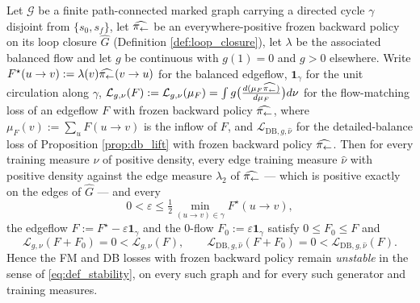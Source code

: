 \begin{proposition}\label{prop:frozen_unstable_full}
Let $\mathcal G$ be a finite path-connected marked graph carrying a directed cycle $\gamma$ disjoint from $\{s_0,s_f\}$, let $\widehat{\pi_{\leftarrow}}$ be an everywhere-positive frozen backward policy on its loop closure $\widehat G$ (Definition \ref{def:loop_closure}), let $\lambda$ be the associated balanced flow and let $g$ be continuous with $g(1)=0$ and $g>0$ elsewhere. Write $F^\star(u\rightarrow v):=\lambda(v)\widehat{\pi_{\leftarrow}}(v\rightarrow u)$ for the balanced edgeflow, $\mathbf 1_\gamma$ for the unit circulation along $\gamma$, $\mathcal L_{g,\nu}(F):=\mathcal L_{g,\nu}(\mu_F)=\int g\bigl(\frac{d(\mu_F\widehat{\pi_{\leftarrow}})}{d\mu_F}\bigr)d\nu$ for the flow-matching loss of an edgeflow $F$ with frozen backward policy $\widehat{\pi_{\leftarrow}}$, where $\mu_F(v):=\sum_uF(u\rightarrow v)$ is the inflow of $F$, and $\mathcal L_{\mathrm{DB},g,\widehat\nu}$ for the detailed-balance loss of Proposition \ref{prop:db_lift} with frozen backward policy $\widehat{\pi_{\leftarrow}}$. Then for every training measure $\nu$ of positive density, every edge training measure $\widehat\nu$ with positive density against the edge measure $\lambda_2$ of $\widehat{\pi_{\leftarrow}}$ --- which is positive exactly on the edges of $\widehat G$ --- and every
\begin{equation}
    0<\varepsilon\leq\tfrac12\min_{(u\rightarrow v)\in\gamma}F^\star(u\rightarrow v),
\end{equation}
the edgeflow $F:=F^\star-\varepsilon\mathbf 1_\gamma$ and the $0$-flow $F_0:=\varepsilon\mathbf 1_\gamma$ satisfy $0\leq F_0\leq F$ and
\begin{equation}
    \mathcal L_{g,\nu}(F+F_0)=0<\mathcal L_{g,\nu}(F),\qquad \mathcal L_{\mathrm{DB},g,\widehat\nu}(F+F_0)=0<\mathcal L_{\mathrm{DB},g,\widehat\nu}(F).
\end{equation}
Hence the FM and DB losses with frozen backward policy remain \emph{unstable} in the sense of \eqref{eq:def_stability}, on every such graph and for every such generator and training measures.
\end{proposition}

